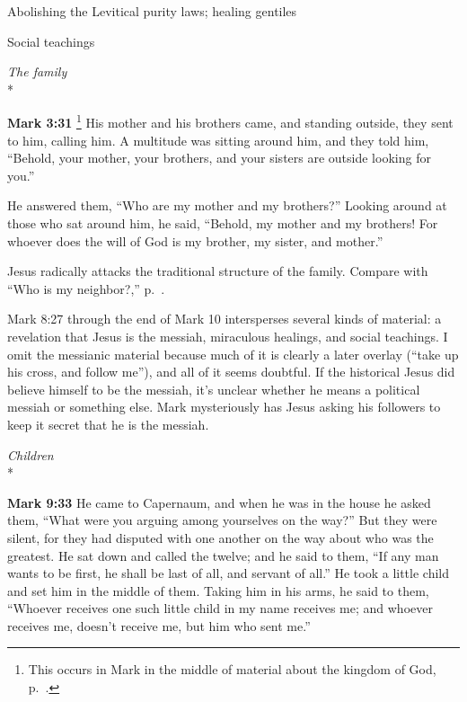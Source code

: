 \documentclass[10pt,twoside]{article} %
\newcommand{\quotesize}{\normalsize{}}
\newcommand{\comm}[1]{\begingroup \color{black!50} #1\endgroup}
\newenvironment{quotetext}{\begingroup\quotesize}{\endgroup}
\newcommand{\intex}[1]{\index[texts]{#1}}
\newcommand{\reftex}[1]{#1\intex{#1}}
\newcommand{\bible}[2]{\begin{quotetext}\textbf{#1}\intex{#1} #2\end{quotetext}}
\newcommand{\gospelmark}[2]{\bible{Mark #1}{#2}}
\newcommand{\subhead}[1]{\emph{#1}\\*}
\begin{document}
\begin{section}{Abolishing the Levitical purity laws; healing gentiles}
\end{section}

\begin{section}{Social teachings}

\subhead{The family}

\gospelmark{3:31}{\label{who-are-my-mother-and-my-brothers}\footnote{This occurs in Mark in the middle of material about the kingdom of God,
p.~\pageref{how-can-satan}.}
  His mother and his brothers came, and standing outside, they sent to him, calling him.   A multitude was sitting around him, and they told him, ``Behold, your mother, your brothers, and your sisters are outside looking for you.''

  He answered them, ``Who are my mother and my brothers?''   Looking around at those who sat around him, he said, ``Behold, my mother and my brothers!    For whoever does the will of God is my brother, my sister, and mother.''
}

\comm{
Jesus radically attacks the traditional structure of the family. Compare with ``Who is my neighbor?,'' p.~\pageref{good-samaritan}.
}

\comm{
\reftex{Mark 8:27} through the end of Mark 10 intersperses several kinds of material: a revelation that Jesus is the messiah,
miraculous healings, and social teachings. I omit the messianic material because much of it is clearly a later overlay
(``take up his cross, and follow me''),
and all of it seems doubtful. If the historical Jesus did believe himself to be the messiah, it's unclear
whether he means a political messiah or something else.
Mark mysteriously has Jesus asking his followers to keep it secret that he is the messiah.
}

\subhead{Children}

\gospelmark{9:33}{
 He came to Capernaum, and when he was in the house he asked them, ``What were you arguing among yourselves on the way?''
  But they were silent, for they had disputed with one another on the way about who was the greatest.
  He sat down and called the twelve; and he said to them, ``If any man wants to be first, he shall be last of all, and servant of all.''   He took a little child and set him in the middle of them. Taking him in his arms, he said to them,    ``Whoever receives one such little child in my name receives me; and whoever receives me, doesn't receive me, but him who sent me.'' 
}


\end{section}
\end{document}
